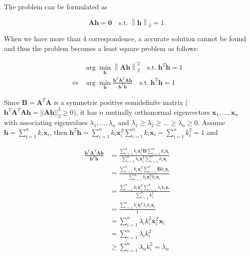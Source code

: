 \documentclass[11pt]{article}
\begin{document}
\newcommand{\norm}[1]{\left\lVert#1\right\rVert}
\newcommand{\bx}{\mathbf{x}}
\newcommand{\bh}{\mathbf{h}}
\newcommand{\bA}{\mathbf{A}}
\newcommand{\bB}{\mathbf{B}}

The problem can be formulated as

\begin{equation}
    \mathbf{Ah} = \mathbf{0} \quad
    \textrm{s.t.} \; \norm{\mathbf{h}}_2 = 1 .
\end{equation}

When we have more than 4 correspondence, a accurate solution cannot be found and thus the problem becomes a least square problem as follows:

\begin{align}
    & \arg\min_{\mathbf{h}} \norm{\mathbf{Ah}}^2_2
    \quad \textrm{s.t.} \; \mathbf{h}^T \mathbf{h} = 1
    \\ \Leftrightarrow
    & \arg\min_{\mathbf{h}}
    \frac{\mathbf{h}^T\mathbf{A}^T\mathbf{A}\mathbf{h}}{\mathbf{h}^T\mathbf{h}}
    \quad \textrm{s.t.} \; \mathbf{h}^T \mathbf{h} = 1
\end{align}

Since $\bB = \bA^T\bA$ is a symmetric positive semidefinite matrix ($\bh^T\bA^T\bA\bh=||\bA\bh||_2^2\geq 0$), it has $n$ mutually orthonormal eigenvectors $\bx_1, \dots, \bx_n$ with associating eigenvalues $\lambda_1,\dots,\lambda_n$ and  $\lambda_1 \geq \lambda_2 \geq \dots \geq \lambda_n \geq 0$. Assume $\bh=\sum_{i=1}^n k_i\bx_i$, then $\bh^T\bh=\sum_{i=1}^n k_i\bx_i^T \sum_{i=1}^n k_i\bx_i= \sum_{i=1}^n k_i^2 = 1$ and

\begin{align}
\begin{split}
  \frac{\bh^T\bA^T\bA\bh}{\bh^T\bh} &=
  \frac{\sum_{i=1}^n k_i\bx_i^T \bB \sum_{i=1}^n k_i\bx_i}{\sum_{i=1}^n k_i\bx_i^T \sum_{i=1}^n k_i\bx_i} \\
  &= \frac{\sum_{i=1}^n k_i\bx_i^T \sum_{i=1}^n \bB k_i\bx_i}{\sum_{i=1}^n k_i\bx_i^T k_i\bx_i} \\
  &= \frac{\sum_{i=1}^n k_i\bx_i^T \sum_{i=1}^n \lambda_i k_i\bx_i}{\sum_{i=1}^n k_i^2 } \\
  &= \frac{\sum_{i=1}^n k_i\bx_i^T \lambda_i k_i\bx_i}{1 } \\
  &= \sum_{i=1}^n \lambda_i k_i^2 \bx_i^T \bx_i \\
  &= \sum_{i=1}^n \lambda_i k_i^2 \\
  &\geq \sum_{i=1}^n \lambda_n k_i^2 = \lambda_n
\end{split}
\end{align}
\end{document}
